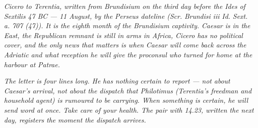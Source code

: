 
\textit{Cicero to Terentia, written from Brundisium on the
third day before the Ides of Sextilis 47 BC --- 11 August,
by the Perseus dateline (\textit{Scr. Brundisi iii Id.
Sext. a. 707 (47)}). It is the eighth month of the
Brundisium captivity. Caesar is in the East, the
Republican remnant is still in arms in Africa, Cicero
has no political cover, and the only news that matters
is when Caesar will come back across the Adriatic and
what reception he will give the proconsul who turned for
home at the harbour at Patrae.}

\textit{The letter is four lines long. He has nothing
certain to report --- not about Caesar's arrival, not
about the dispatch that Philotimus (Terentia's freedman
and household agent) is rumoured to be carrying. When
something is certain, he will send word at once. Take
care of your health. The pair with 14.23, written the
next day, registers the moment the dispatch arrives.}
